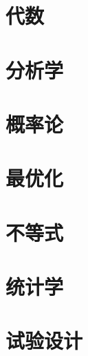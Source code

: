 \documentclass[11pt, a4paper, twoside, openany, UTF8]{ctexbook}
\begin{document}
\maketitle
\frontmatter	
\listoftodos

\tableofcontents

\mainmatter
\part{代数}


\part{分析学}










\part{概率论}



\part{最优化}


\part{不等式}

\part{统计学}







\part{试验设计}

\end{document}
